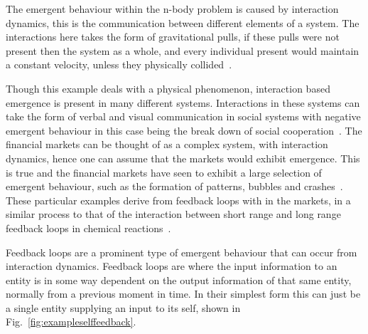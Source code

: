 \documentclass{article}
\begin{document}
The emergent behaviour within the n-body problem is caused by interaction dynamics, this is the communication between different elements of a system. The interactions here takes the form of gravitational pulls, if these pulls were not present then the system as a whole, and every individual present would maintain a constant velocity, unless they physically collided~\cite{newtonconstantvelocity}.

Though this example deals with a physical phenomenon, interaction based emergence is present in many different systems. Interactions in these systems can take the form of verbal and visual communication in social systems with negative emergent behaviour in this case being the break down of social cooperation~\cite{socialemrgence}. The financial markets can be thought of as a complex system, with interaction dynamics, hence one can assume that the markets would exhibit emergence. This is true and the financial markets have seen to exhibit a large selection of emergent behaviour, such as the formation of patterns, bubbles and crashes~\cite{bubblesandcrashes}. These particular examples derive from feedback loops with in the markets, in a similar process to that of the interaction between short range and long range feedback loops in chemical reactions~\cite{turningchemical}.     

Feedback loops are a prominent type of emergent behaviour that can occur from interaction dynamics. Feedback loops are where the input information to an entity is in some way dependent on the output information of that same entity, normally from a previous moment in time. In their simplest form this can just be a single entity supplying an input to its self, shown in Fig.~\ref{fig:exampleselffeedback}.
\end{document}
